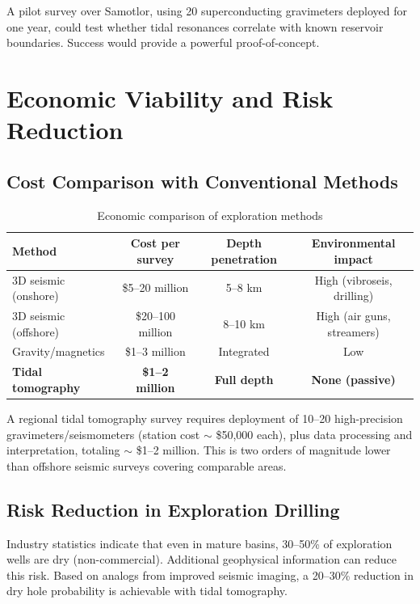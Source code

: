 \documentclass[12pt,a4paper]{article}
\theoremstyle{remark}
\begin{document}
	A pilot survey over Samotlor, using 20 superconducting gravimeters deployed for one year, could test whether tidal resonances correlate with known reservoir boundaries. Success would provide a powerful proof-of-concept.
	
	\section{Economic Viability and Risk Reduction}
	\label{sec:economics}
	
	\subsection{Cost Comparison with Conventional Methods}
	
	\begin{table}[htbp]
		\centering
		\caption{Economic comparison of exploration methods}
		\label{tab:economics}
		\small
		\begin{tabular}{lccc}
			\toprule
			\textbf{Method} & \textbf{Cost per survey} & \textbf{Depth penetration} & \textbf{Environmental impact} \\
			\midrule
			3D seismic (onshore) & \$5–20 million & 5–8 km & High (vibroseis, drilling) \\
			3D seismic (offshore) & \$20–100 million & 8–10 km & High (air guns, streamers) \\
			Gravity/magnetics & \$1–3 million & Integrated & Low \\
			\textbf{Tidal tomography} & \textbf{\$1–2 million} & \textbf{Full depth} & \textbf{None (passive)} \\
			\bottomrule
		\end{tabular}
	\end{table}
	
	A regional tidal tomography survey requires deployment of 10–20 high-precision gravimeters/seismometers (station cost \(\sim\) \$50,000 each), plus data processing and interpretation, totaling \(\sim\) \$1–2 million. This is two orders of magnitude lower than offshore seismic surveys covering comparable areas.
	
	\subsection{Risk Reduction in Exploration Drilling}
	
	Industry statistics indicate that even in mature basins, 30–50\% of exploration wells are dry (non-commercial). Additional geophysical information can reduce this risk. Based on analogs from improved seismic imaging, a 20–30\% reduction in dry hole probability is achievable with tidal tomography.
	
\end{document}
